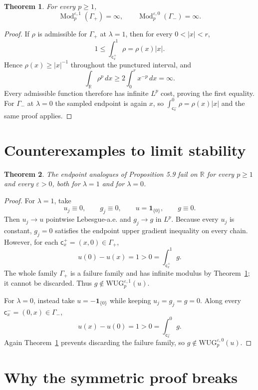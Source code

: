 \documentclass[11pt]{article}
\newtheorem{theorem}{Theorem}
\newcommand{\R}{\mathbb R}
\newcommand{\Mod}{\operatorname{Mod}}
\begin{document}
\begin{theorem}\label{thm:modulus}
For every $p\ge1$,
\[
 \Mod^{\varepsilon,1}_p(\Gamma_+)=\infty,
 \qquad
 \Mod^{\varepsilon,0}_p(\Gamma_-)=\infty.
\]
\end{theorem}

\begin{proof}
If $\rho$ is admissible for $\Gamma_+$ at $\lambda=1$, then for every
$0<|x|<r$,
\[
 1\le\int_{\mathsf c_x^+}^{1}\rho=\rho(x)|x|.
\]
Hence $\rho(x)\ge |x|^{-1}$ throughout the punctured interval, and
\[
 \int_{\R}\rho^p\,dx
 \ge2\int_0^r x^{-p}\,dx=\infty.
\]
Every admissible function therefore has infinite $L^p$ cost, proving
the first equality.  For $\Gamma_-$ at $\lambda=0$ the sampled endpoint
is again $x$, so
$\int_{\mathsf c_x^-}^{0}\rho=\rho(x)|x|$ and the same proof applies.
\end{proof}

\section{Counterexamples to limit stability}

\begin{theorem}\label{thm:counterexample}
The endpoint analogues of Proposition 5.9 fail on $\R$ for every
$p\ge1$ and every $\varepsilon>0$, both for $\lambda=1$ and for
$\lambda=0$.
\end{theorem}

\begin{proof}
For $\lambda=1$, take
\[
 u_j\equiv0,\qquad g_j\equiv0,
 \qquad u=\mathbf1_{\{0\}},\qquad g\equiv0.
\]
Then $u_j\to u$ pointwise Lebesgue-a.e. and $g_j\to g$ in $L^p$.
Because every $u_j$ is constant, $g_j=0$ satisfies the endpoint upper
gradient inequality on every chain.  However, for each
$\mathsf c_x^+=(x,0)\in\Gamma_+$,
\[
 u(0)-u(x)=1>0=\int_{\mathsf c_x^+}^{1}g.
\]
The whole family $\Gamma_+$ is a failure family and has infinite
modulus by Theorem~\ref{thm:modulus}; it cannot be discarded.  Thus
$g\notin\mathrm{WUG}^{\varepsilon,1}_p(u)$.

For $\lambda=0$, instead take $u=-\mathbf1_{\{0\}}$ while keeping
$u_j=g_j=g=0$.  Along every $\mathsf c_x^-=(0,x)\in\Gamma_-$,
\[
 u(x)-u(0)=1>0=\int_{\mathsf c_x^-}^{0}g.
\]
Again Theorem~\ref{thm:modulus} prevents discarding the failure family,
so $g\notin\mathrm{WUG}^{\varepsilon,0}_p(u)$.
\end{proof}

\section{Why the symmetric proof breaks}
\end{document}
